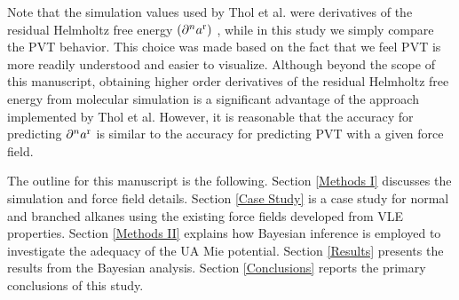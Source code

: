 \documentclass[journal=jctc,manuscript=article]{achemso}
\begin{document}
Note that the simulation values used by Thol et al. were derivatives of the residual Helmholtz free energy $(\partial^n a^{\rm r})$ \cite{Thol2016_siloxane_first,Thol2016_siloxane,Thol2017}, while in this study we simply compare the PVT behavior. This choice was made based on the fact that we feel PVT is more readily understood and easier to visualize. Although beyond the scope of this manuscript, obtaining higher order derivatives of the residual Helmholtz free energy from molecular simulation is a significant advantage of the approach implemented by Thol et al. However, it is reasonable that the accuracy for predicting $\partial^n a^{\rm r}$ is similar to the accuracy for predicting PVT with a given force field.

The outline for this manuscript is the following. Section \ref{Methods I} discusses the simulation and force field details. Section \ref{Case Study} is a case study for normal and branched alkanes using the existing force fields developed from VLE properties. Section \ref{Methods II} explains how Bayesian inference is employed to investigate the adequacy of the UA Mie potential. Section \ref{Results} presents the results from the Bayesian analysis. Section \ref{Conclusions} reports the primary conclusions of this study.

%
%
%
%
%
%
%
\end{document}
